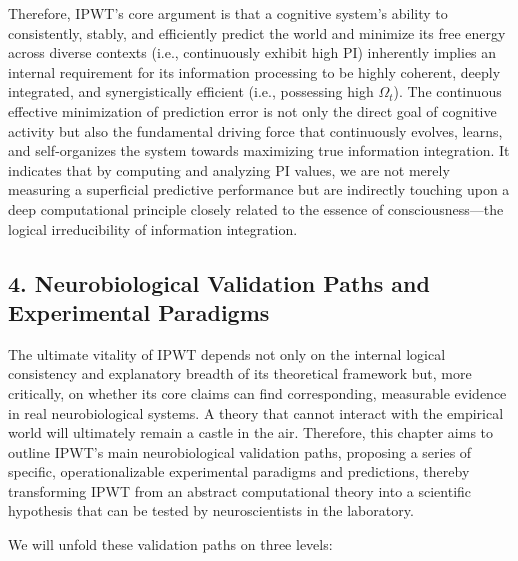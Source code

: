 \documentclass[
  a4paper]{article}
\begin{document}
Therefore, IPWT's core argument is that a cognitive system's ability to
consistently, stably, and efficiently predict the world and minimize its
free energy across diverse contexts (i.e., continuously exhibit high PI)
inherently implies an internal requirement for its information
processing to be highly coherent, deeply integrated, and synergistically
efficient (i.e., possessing high \(\Omega_t\)). The continuous effective
minimization of prediction error is not only the direct goal of
cognitive activity but also the fundamental driving force that
continuously evolves, learns, and self-organizes the system towards
maximizing true information integration. It indicates that by computing
and analyzing PI values, we are not merely measuring a superficial
predictive performance but are indirectly touching upon a deep
computational principle closely related to the essence of
consciousness---the logical irreducibility of information integration.

\subsection{4. Neurobiological Validation Paths and Experimental
Paradigms}\label{neurobiological-validation-paths-and-experimental-paradigms}

The ultimate vitality of IPWT depends not only on the internal logical
consistency and explanatory breadth of its theoretical framework but,
more critically, on whether its core claims can find corresponding,
measurable evidence in real neurobiological systems. A theory that
cannot interact with the empirical world will ultimately remain a castle
in the air. Therefore, this chapter aims to outline IPWT's main
neurobiological validation paths, proposing a series of specific,
operationalizable experimental paradigms and predictions, thereby
transforming IPWT from an abstract computational theory into a
scientific hypothesis that can be tested by neuroscientists in the
laboratory.

We will unfold these validation paths on three levels:
\end{document}
